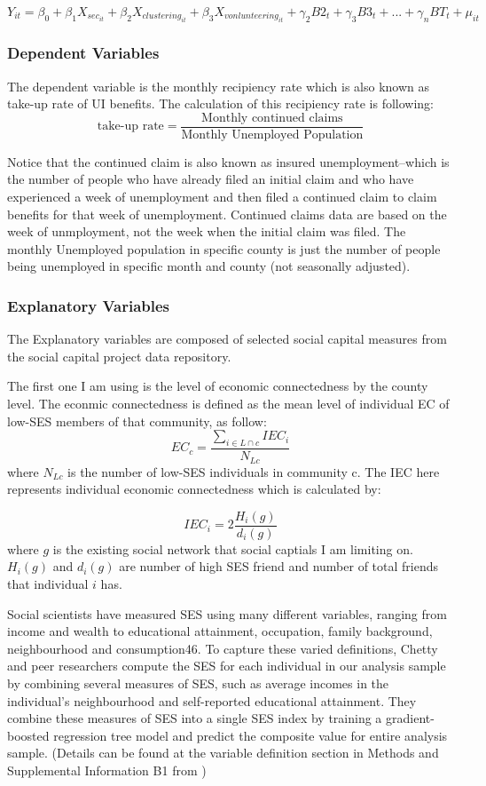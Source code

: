 \documentclass{article}
\begin{document}
$Y_{it}=\beta_0+\beta_1 X_{sec_{it}}+\beta_2 X_{clustering_{it}}+\beta_3 X_{vonlunteering_{it}}+\gamma_2 B2_t+\gamma_3 B3_t +...+\gamma_n BT_t+\mu_{it}$

\subsubsection{Dependent Variables}

The dependent variable is the monthly recipiency rate which is also known as take-up rate of UI benefits. The calculation of this recipiency rate is following: $$\text{take-up rate}=\frac{\text{Monthly continued claims}}{\text{Monthly Unemployed Population}}$$

Notice that the continued claim is also known as insured unemployment--which is the number of people who have already filed an initial claim and who have experienced a week of unemployment and then filed a continued claim to claim benefits for that week of unemployment. Continued claims data are based on the week of unmployment, not the week when the initial claim was filed. The monthly Unemployed population in specific county is just the number of people being unemployed in specific month and county (not seasonally adjusted).

\subsubsection{Explanatory Variables}

The Explanatory variables are composed of selected social capital measures from the social capital project data repository.

The first one I am using is the level of economic connectedness by the county level. The econmic connectedness is defined as the mean level of individual EC of low-SES members of that community, as follow: $$EC_c=\frac{\sum_{i\in L \cap c}{IEC_i}}{N_{Lc}}$$ where $N_{Lc}$ is the number of low-SES individuals in community c. The IEC here represents individual economic connectedness which is calculated by:

$$IEC_i=2\frac{H_i(g)}{d_i(g)}$$ where $g$ is the existing social network that social captials I am limiting on. $H_i(g)$ and $d_i(g)$ are number of high SES friend and number of total friends that individual $i$ has.

Social scientists have measured SES using many different variables, ranging from income and wealth to educational attainment, occupation, family background, neighbourhood and consumption46. To capture these varied definitions, Chetty and peer researchers compute the SES for each individual in our analysis sample by combining several measures of SES, such as average incomes in the individual’s neighbourhood and self-reported educational attainment. They combine these measures of SES into a single SES index by training a gradient-boosted regression tree model and predict the composite value for entire analysis sample. (Details can be found at the variable definition section in Methods and Supplemental Information B1 from \cite{chetty2022social1})
\end{document}
